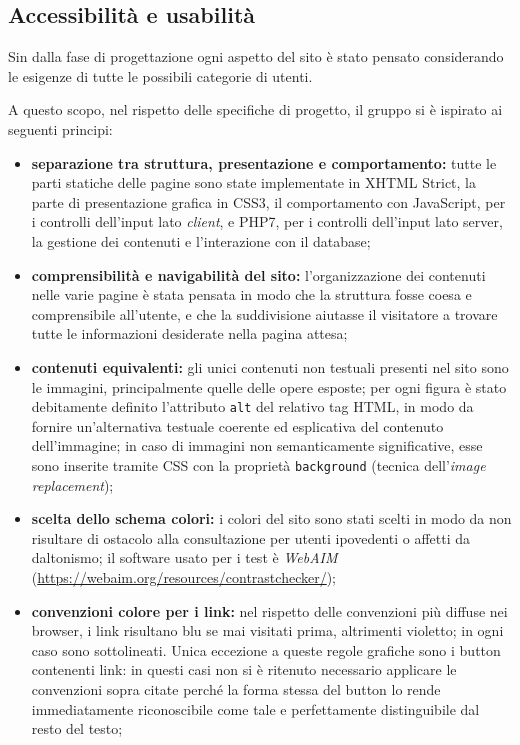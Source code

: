 \subsection{Accessibilità e usabilità}
\label{progettazione-accessibilità-usabilità}
Sin dalla fase di progettazione ogni aspetto del sito è stato pensato considerando le esigenze di tutte le possibili categorie di utenti. 


A questo scopo, nel rispetto delle specifiche di progetto, il gruppo si è ispirato ai seguenti principi:
\begin{itemize}
	\item \textbf{separazione tra struttura, presentazione e comportamento:} tutte le parti statiche delle pagine sono state implementate in XHTML Strict, la parte di presentazione grafica in CSS3, il comportamento con JavaScript, per i controlli dell'input lato \textit{client}, e PHP7, per i controlli dell'input lato server, la gestione dei contenuti e l'interazione con il database;
	
	\item \textbf{comprensibilità e navigabilità del sito:} l'organizzazione dei contenuti nelle varie pagine è stata pensata in modo che la struttura fosse coesa e comprensibile all'utente, e che la suddivisione aiutasse il visitatore a trovare tutte le informazioni desiderate nella pagina attesa;
	
	\item \textbf{contenuti equivalenti:} gli unici contenuti non testuali presenti nel sito sono le immagini, principalmente quelle delle opere esposte; per ogni figura è stato debitamente definito l'attributo \texttt{alt} del relativo tag HTML, in modo da fornire un'alternativa testuale coerente ed esplicativa del contenuto dell'immagine; in caso di immagini non semanticamente significative, esse sono inserite tramite CSS con la proprietà \texttt{background} (tecnica dell'\textit{image replacement});
	
	\item \textbf{scelta dello schema colori:} i colori del sito sono stati scelti in modo da non risultare di ostacolo alla consultazione per utenti ipovedenti o affetti da daltonismo; il software usato per i test è \textit{WebAIM} (\url{https://webaim.org/resources/contrastchecker/}); 
	
	\item \textbf{convenzioni colore per i link:} nel rispetto delle convenzioni più diffuse nei browser, i link risultano blu se mai visitati prima, altrimenti violetto; in ogni caso sono sottolineati. Unica eccezione a queste regole grafiche sono i button contenenti link: in questi casi non si è ritenuto necessario applicare le convenzioni sopra citate perché la forma stessa del button lo rende immediatamente riconoscibile come tale e perfettamente distinguibile dal resto del testo;
	

\end{itemize}
